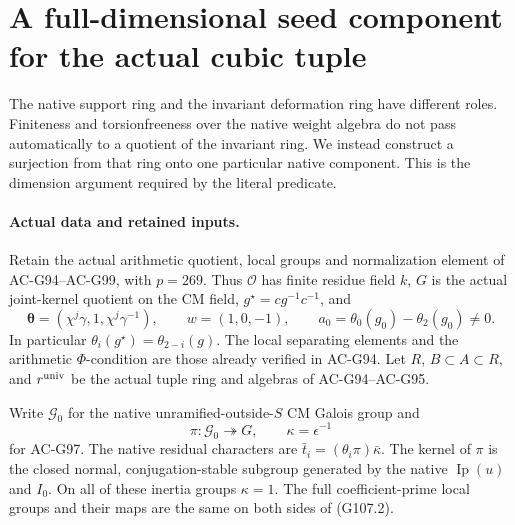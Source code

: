\section{A full-dimensional seed component for the actual cubic tuple}
\label{sec:cubic-tuple-seed-component}

The native support ring and the invariant deformation ring have
different roles.  Finiteness and torsionfreeness over the native
weight algebra do not pass automatically to a quotient of the
invariant ring.  We instead construct a surjection from that ring
onto one particular native component.  This is the dimension
argument required by the literal  predicate.

\paragraph{Actual data and retained inputs.}
Retain the actual arithmetic quotient, local groups and
normalization element of AC-G94--AC-G99, with \(p=269\).
Thus \(\mathcal O\) has finite residue field \(k\),
\(G\) is the actual joint-kernel quotient on the CM field,
\(g^\star=cg^{-1}c^{-1}\), and
\[
 \boldsymbol\theta=(\chi^j\gamma,1,\chi^j\gamma^{-1}),\qquad
 w=(1,0,-1),\qquad
 a_0=\theta_0(g_0)-\theta_2(g_0)\ne0.
 \tag{G107.1}
\]
In particular \(\theta_i(g^\star)=\theta_{2-i}(g)\).
The local separating elements and the arithmetic
\(\Phi\)-condition are those already verified in AC-G94.
Let \(R\), \(B\subset A\subset R\), and \(r^{\rm univ}\)
be the actual tuple ring and algebras of AC-G94--AC-G95.

Write \(\mathcal G_0\) for the native unramified-outside-\(S\)
CM Galois group and
\[
 \pi:\mathcal G_0\twoheadrightarrow G,\qquad
 \kappa=\epsilon^{-1}
 \tag{G107.2}
\]
for AC-G97.  The native residual characters are
\(\bar t_i=(\theta_i\pi)\bar\kappa\).
The kernel of \(\pi\) is the closed normal,
conjugation-stable subgroup generated by the native
\(\operatorname{Ip}(u)\) and \(I_0\).
On all of these inertia groups \(\kappa=1\).
The full coefficient-prime local groups and their maps are
the same on both sides of (G107.2).

